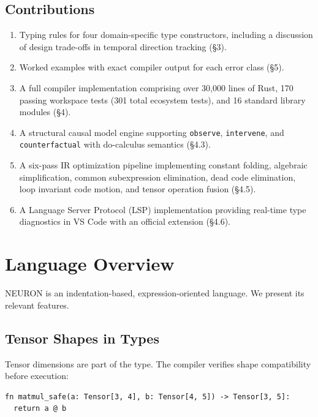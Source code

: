 \documentclass[11pt,a4paper]{article}
\newcommand{\ty}[1]{\texttt{#1}}
\begin{document}
\subsection{Contributions}

\begin{enumerate}[itemsep=2pt]
  \item Typing rules for four domain-specific type constructors, including a discussion of design trade-offs in temporal direction tracking (\S3).
  \item Worked examples with exact compiler output for each error class (\S5).
  \item A full compiler implementation comprising over 30,000 lines of Rust, 170 passing workspace tests (301 total ecosystem tests), and 16 standard library modules (\S4).
  \item A structural causal model engine supporting \ty{observe}, \ty{intervene}, and \ty{counterfactual} with do-calculus semantics (\S4.3).
  \item A six-pass IR optimization pipeline implementing constant folding, algebraic simplification, common subexpression elimination, dead code elimination, loop invariant code motion, and tensor operation fusion (\S4.5).
  \item A Language Server Protocol (LSP) implementation providing real-time type diagnostics in VS Code with an official extension (\S4.6).
\end{enumerate}


\section{Language Overview}

NEURON is an indentation-based, expression-oriented language. We present its relevant features.

\subsection{Tensor Shapes in Types}

Tensor dimensions are part of the type. The compiler verifies shape compatibility before execution:

\begin{lstlisting}
fn matmul_safe(a: Tensor[3, 4], b: Tensor[4, 5]) -> Tensor[3, 5]:
  return a @ b
\end{lstlisting}
\end{document}
